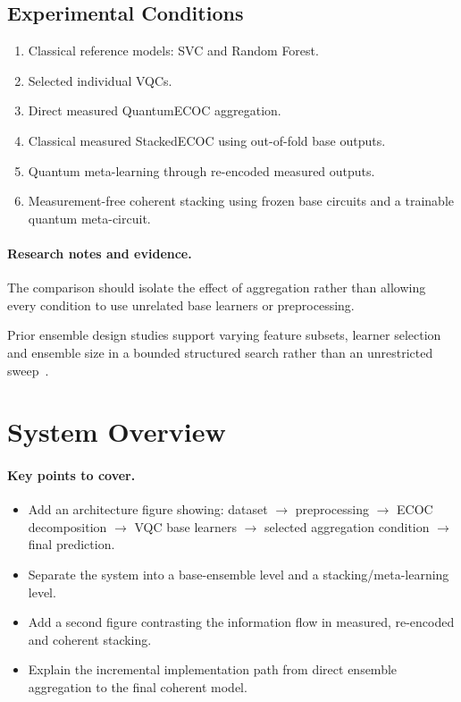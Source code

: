 \documentclass[]{UCD_CS_MSc_AAI_Report}
\newcommand{\method}[1]{{\color{cyan!80!black}#1}}
\newcommand{\comparison}[1]{{\color{pink!70!violet}#1}}
\newcommand{\sectionbrief}{\paragraph{Key points to cover.}}
\newcommand{\researchnotes}{\paragraph{Research notes and evidence.}}
\begin{document}
\subsection{Experimental Conditions}

\begin{enumerate}
    \item Classical reference models: SVC and Random Forest.
    \item Selected individual VQCs.
    \item Direct measured QuantumECOC aggregation.
    \item Classical measured StackedECOC using out-of-fold base outputs.
    \item Quantum meta-learning through re-encoded measured outputs.
    \item Measurement-free coherent stacking using frozen base circuits and a trainable quantum meta-circuit.
\end{enumerate}

\researchnotes
\begin{itemize}
    \comparison{\item The comparison should isolate the effect of aggregation rather than allowing every condition to use unrelated base learners or preprocessing.}
    \method{\item Prior ensemble design studies support varying feature subsets, learner selection and ensemble size in a bounded structured search rather than an unrestricted sweep~\cite{dong_survey_2020,demir_modified_2018,pinto_composing_2026}.}
\end{itemize}

\section{System Overview}
\label{sec:method-system}

\sectionbrief
\begin{itemize}
    \item Add an architecture figure showing: dataset $\rightarrow$ preprocessing $\rightarrow$ ECOC decomposition $\rightarrow$ VQC base learners $\rightarrow$ selected aggregation condition $\rightarrow$ final prediction.
    \item Separate the system into a base-ensemble level and a stacking/meta-learning level.
    \item Add a second figure contrasting the information flow in measured, re-encoded and coherent stacking.
    \item Explain the incremental implementation path from direct ensemble aggregation to the final coherent model.
\end{itemize}
\end{document}
